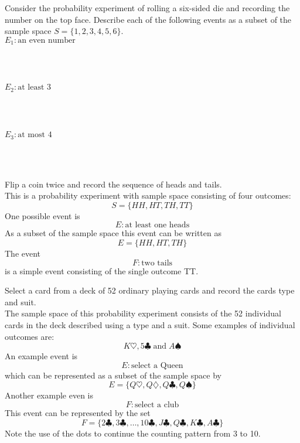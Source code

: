 \documentclass[handout]{ximera}
\begin{document}
	\begin{problem}
	Consider the probability experiment of rolling a six-sided die and recording the number on the top face. Describe each of the following events as a subset of the sample space $S = \{1, 2, 3, 4, 5, 6\}$.\\
	$E_1: \mbox{an even number}$
	\begin{multipleChoice}
	\\
	\\
	\end{multipleChoice}
	
	$E_2: \mbox{at least 3}$
	\begin{multipleChoice}
	\\
	\\
	\choice[correct]{$E_2 = \{3, 4, 5, 6\}$}
	\end{multipleChoice}
	
	$E_3: \mbox{at most 4}$
	\begin{multipleChoice}
	\\
	\\
	\choice{$E_3 = \{1, 4\}$}
	\end{multipleChoice}
	
	\end{problem}
	
	
	
	\begin{example}
	Flip a coin twice and record the sequence of heads and tails.\\
	This is a probability experiment with sample space consisting of four outcomes:
	\[
	S = \{HH, HT, TH, TT\}
	\]
	One possible event is
	\[
	E: \mbox{at least one heads}
	\]
	As a subset of the sample space this event can be written as
	\[
	E = \{HH, HT, TH\}
	\]
	The event
	\[
	F: \mbox{two tails}
	\]
	is a simple event consisting of the single outcome TT.
	
	\end{example}
	
	\begin{example}
	Select a card from a deck of 52 ordinary playing cards and record the cards type and suit.\\
	The sample space of this probability experiment consists of the 52 individual cards in the deck described using a type and a suit.  Some examples of individual outcomes are:
	\[
	K\heartsuit, 5 \clubsuit \; \mbox {and} \; A\spadesuit
	\]
	An example event is
	\[
	E: \mbox{select a Queen}
	\]
	which can be represented as a subset of the sample space by
	\[
	E = \{Q\heartsuit, Q\diamondsuit, Q\clubsuit, Q\spadesuit\}
	\]
	Another example even is
	\[
 F: \mbox{select a club}
\]
This event can be represented by the set
\[
F = \{2\clubsuit,3\clubsuit,\dots,10\clubsuit,J\clubsuit,Q\clubsuit,K\clubsuit, A\clubsuit\}
\]
Note the use of the dots to continue the counting pattern from 3 to 10.
	\end{example}
	
\end{document}
